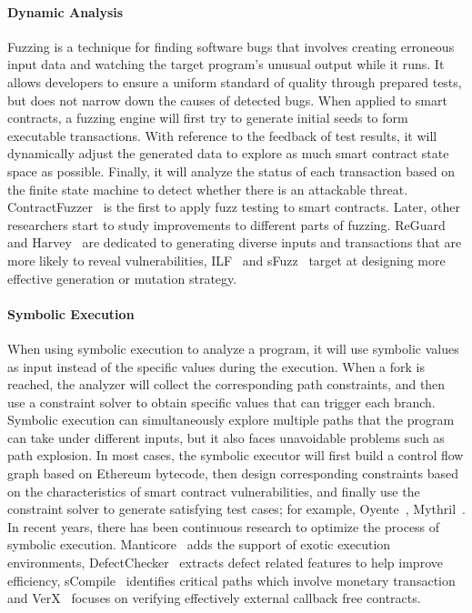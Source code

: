 \paragraph{Dynamic Analysis}
Fuzzing is a technique for finding software bugs that involves creating erroneous input data and watching the target program's unusual output while it runs.
It allows developers to ensure a uniform standard of quality through prepared tests, but does not narrow down the causes of detected bugs.
When applied to smart contracts, a fuzzing engine will first try to generate initial seeds to form executable transactions.
With reference to the feedback of test results, it will dynamically adjust the generated data to explore as much smart contract state space as possible.
Finally, it will analyze the status of each transaction based on the finite state machine to detect whether there is an attackable threat.
ContractFuzzer~\cite{contractfuzzer} is the first to apply fuzz testing to smart contracts. Later, other researchers start to study improvements to different parts of fuzzing.
ReGuard~\cite{liu2018reguard} and Harvey~\cite{wustholz2020harvey} are dedicated to generating diverse inputs and transactions that are more likely to reveal vulnerabilities,
ILF~\cite{he2019learning} and sFuzz~\cite{nguyen2020sfuzz} target at designing more effective generation or mutation strategy.

\paragraph{Symbolic Execution}
When using symbolic execution to analyze a program, it will use symbolic values as input instead of the specific values during the execution.
When a fork is reached, the analyzer will collect the corresponding path constraints, and then use a constraint solver to obtain specific values that can trigger each branch.
Symbolic execution can simultaneously explore multiple paths that the program can take under different inputs, but it also faces unavoidable problems such as path explosion.
In most cases, the symbolic executor will first build a control flow graph based on Ethereum bytecode, then design corresponding constraints based on the characteristics of smart contract vulnerabilities, and finally use the constraint solver to generate satisfying test cases; for example, Oyente~\cite{oyente}, Mythril~\cite{mythril}.
In recent years, there has been continuous research to optimize the process of symbolic execution.
Manticore~\cite{mossberg2019manticore} adds the support of exotic execution environments, DefectChecker~\cite{chen2021defectchecker} extracts defect related features to help improve efficiency, sCompile~\cite{chang2019scompile} identifies critical paths which involve monetary transaction and VerX~\cite{permenev2020verx} focuses on verifying effectively external callback free contracts.

